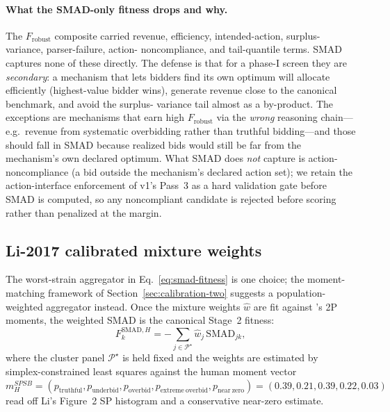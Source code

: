 \documentclass[12pt]{article}
\newcommand{\SPSB}{SPSB}
\begin{document}
\paragraph{What the SMAD-only fitness drops and why.} The
$F_{\mathrm{robust}}$ composite carried revenue, efficiency,
intended-action, surplus-variance, parser-failure, action-
noncompliance, and tail-quantile terms. SMAD captures none of these
directly. The defense is that for a phase-I screen they are
\emph{secondary}: a mechanism that lets bidders find its own optimum
will allocate efficiently (highest-value bidder wins), generate
revenue close to the canonical benchmark, and avoid the surplus-
variance tail almost as a by-product. The exceptions are mechanisms
that earn high $F_{\mathrm{robust}}$ via the \emph{wrong} reasoning
chain---e.g.\ revenue from systematic overbidding rather than
truthful bidding---and those should fall in SMAD because realized
bids would still be far from the mechanism's own declared optimum.
What SMAD does \emph{not} capture is action-noncompliance (a bid
outside the mechanism's declared action set); we retain the
action-interface enforcement of v1's Pass~3 as a hard validation
gate before SMAD is computed, so any noncompliant candidate is
rejected before scoring rather than penalized at the margin.

\subsection{Li-2017 calibrated mixture weights}
\label{sec:li-mixture}

The worst-strain aggregator in Eq.~\eqref{eq:smad-fitness} is one
choice; the moment-matching framework of
Section~\ref{sec:calibration-two} suggests a population-weighted
aggregator instead. Once the mixture weights $\widehat{w}$ are fit
against \citet{li2017}'s 2P moments, the weighted SMAD is the
canonical Stage~2 fitness:
\begin{equation}
F^{\mathrm{SMAD},H}_k
=
- \sum_{j \in \mathcal{P}^{\star}} \widehat{w}_j\, \mathrm{SMAD}_{jk},
\label{eq:smad-weighted}
\end{equation}
where the cluster panel $\mathcal{P}^{\star}$ is held fixed and the
weights are estimated by simplex-constrained least squares against
the human moment vector
$m_H^{\SPSB} = (p_{\mathrm{truthful}},
p_{\mathrm{underbid}},
p_{\mathrm{overbid}},
p_{\mathrm{extreme\ overbid}},
p_{\mathrm{near\ zero}})
= (0.39, 0.21, 0.39, 0.22, 0.03)$
read off Li's Figure~2 SP histogram and a conservative near-zero
estimate.
\end{document}
